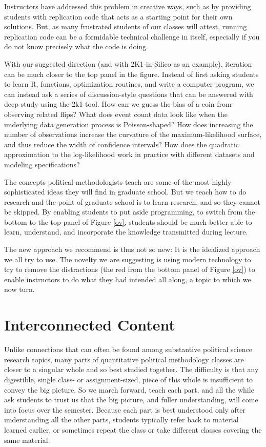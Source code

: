 \documentclass[12pt]{article}
\theoremstyle{definition}
\begin{document}
Instructors have addressed this problem in creative ways, such as by providing students with replication code that acts as a starting point for their own solutions. But, as many frustrated students of our classes will attest, running replication code can be a formidable technical challenge in itself, especially if you do not know precisely what the code is doing.

With our suggested direction (and with 2K1-in-Silico as an example), iteration can be much closer to the top panel in the figure.  Instead of first asking students to learn R, functions, optimization routines, and write a computer program, we can instead ask a series of discussion-style questions that can be answered with deep study using the 2k1 tool. How can we guess the bias of a coin from observing related flips? What does event count data look like when the underlying data generation process is Poisson-shaped? How does increasing the number of observations increase the curvature of the maximum-likelihood surface, and thus reduce the width of confidence intervals? How does the quadratic approximation to the log-likelihood work in practice with different datasets and modeling specifications?

The concepts political methodologists teach are some of the most highly sophisticated ideas they will find in graduate school. But we teach how to do research and the point of graduate school is to learn research, and so they cannot be skipped.  By enabling students to put aside programming, to switch from the bottom to the top panel of Figure \ref{ov}, students should be much better able to learn, understand, and incorporate the knowledge transmitted during lecture.

The new approach we recommend is thus not so new: It is the idealized approach we all try to use. The novelty we are suggesting is using modern technology to try to remove the distractions (the red from the bottom panel of Figure \ref{ov}) to enable instructors to do what they had intended all along, a topic to which we now turn.

\section{Interconnected Content}

Unlike connections that can often be found among substantive political science research topics, many parts of quantitative political methodology classes are closer to a singular whole and so best studied together. The difficulty is that any digestible, single class- or assignment-sized, piece of this whole is insufficient to convey the big picture. So we march forward, teach each part, and all the while ask students to trust us that the big picture, and fuller understanding, will come into focus over the semester. Because each part is best understood only after understanding all the other parts, students typically refer back to material learned earlier, or sometimes repeat the class or take different classes covering the same material.
\end{document}
